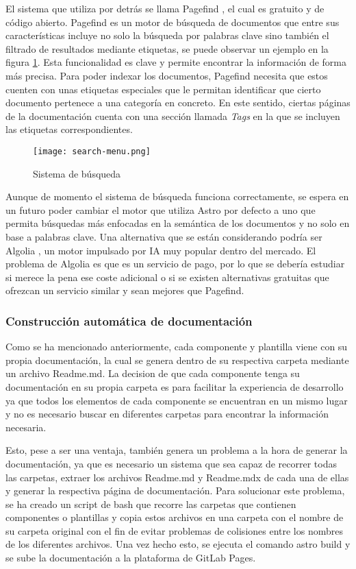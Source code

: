 El sistema que utiliza por detrás se llama Pagefind \cite{Pagefind}, el cual es gratuito 
y de código abierto. Pagefind es un motor de búsqueda de documentos
que entre sus características incluye no solo la búsqueda por palabras
clave sino también el filtrado de resultados mediante etiquetas, se puede observar
un ejemplo en la figura \ref{fig:search-menu}. Esta 
funcionalidad es clave y permite encontrar la información de forma más precisa. 
Para poder indexar los documentos, Pagefind necesita que estos cuenten con
unas etiquetas especiales que le permitan identificar que cierto documento
pertenece a una categoría en concreto. En este sentido, ciertas páginas
de la documentación cuenta con una sección llamada \textit{Tags} en la que
se incluyen las etiquetas correspondientes.\medskip

\begin{figure}[!h]
    \centering
    \texttt{[image: search-menu.png]}
    \caption{Sistema de búsqueda}\label{fig:search-menu}
\end{figure}

Aunque de momento el sistema de búsqueda funciona correctamente, se
espera en un futuro poder cambiar el motor que utiliza Astro por defecto 
a uno que permita búsquedas más enfocadas en la semántica
de los documentos y no solo en base a palabras clave. Una alternativa que
se están considerando podría ser Algolia \cite{algoliaWhatAlgolia},
un motor impulsado por IA muy popular dentro del mercado. El
problema de Algolia es que es un servicio de pago, por lo que se
debería estudiar si merece la pena ese coste adicional o si se
existen alternativas gratuitas que ofrezcan un servicio similar y
sean mejores que Pagefind.

\subsubsection{Construcción automática de documentación}
Como se ha mencionado anteriormente, cada componente y plantilla 
viene con su propia documentación, la cual se genera dentro de su
respectiva carpeta mediante un archivo Readme.md. La decision de 
que cada componente tenga su documentación en su propia carpeta
es para facilitar la experiencia de desarrollo ya que todos los
elementos de cada componente se encuentran en un mismo lugar y no
es necesario buscar en diferentes carpetas para encontrar la
información necesaria.\medskip

Esto, pese a ser una ventaja, también genera un problema a la hora de
generar la documentación, ya que es necesario un sistema que sea
capaz de recorrer todas las carpetas, extraer los archivos Readme.md
y Readme.mdx de cada una de ellas y generar la respectiva página
de documentación. Para solucionar este problema, se ha creado un
script de bash que recorre las carpetas que contienen componentes o
plantillas y copia estos archivos en una carpeta con el nombre de
su carpeta original con el fin de evitar problemas de colisiones
entre los nombres de los diferentes archivos. Una vez hecho esto,
se ejecuta el comando astro build y se sube la documentación a la
plataforma de GitLab Pages.

